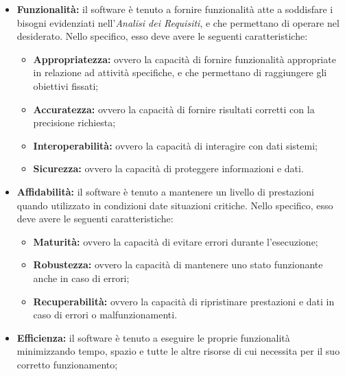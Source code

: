 \documentclass[openany,12pt,a4paper]{report}
\begin{document}
\begin{itemize}
    \item \textbf{Funzionalità:} il software è tenuto a fornire funzionalità atte a soddisfare i bisogni evidenziati nell'\textit{Analisi dei Requisiti}, e che permettano di operare nel  desiderato. Nello specifico, esso deve avere le seguenti caratteristiche:

    \begin{itemize}
        \item \textbf{Appropriatezza:} ovvero la capacità di fornire funzionalità appropriate in relazione ad attività specifiche, e che permettano di raggiungere gli obiettivi fissati;
        
        \item \textbf{Accuratezza:} ovvero la capacità di fornire risultati corretti con la precisione richiesta;
        
        \item \textbf{Interoperabilità:} ovvero la capacità di interagire con dati sistemi;
        
        \item \textbf{Sicurezza:} ovvero la capacità di proteggere informazioni e dati.
    \end{itemize}
    
    \item \textbf{Affidabilità:} il software è tenuto a mantenere un livello di prestazioni quando utilizzato in condizioni date situazioni critiche. Nello specifico, esso deve avere le seguenti caratteristiche:

    \begin{itemize}
        \item \textbf{Maturità:} ovvero la capacità di evitare errori durante l'esecuzione;
        
        \item \textbf{Robustezza:} ovvero la capacità di mantenere uno stato funzionante anche in caso di errori;
        
        \item \textbf{Recuperabilità:} ovvero la capacità di ripristinare prestazioni e dati in caso di errori o malfunzionamenti.
    \end{itemize}

    \item \textbf{Efficienza:} il software è tenuto a eseguire le proprie funzionalità minimizzando tempo, spazio e tutte le altre risorse di cui necessita per il suo corretto funzionamento;
    

\end{itemize}
\end{document}
